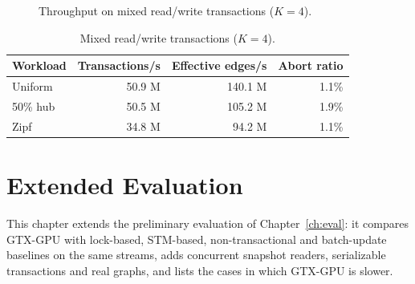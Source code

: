 \documentclass[11pt,a4paper,oneside]{report}
\newcommand{\sys}{GTX-GPU}
\begin{document}
\begin{figure}[H]
\centering
{}
\caption{Throughput on mixed read/write transactions ($K=4$).}
\label{fig:mix}
\end{figure}

\begin{table}[H]
\caption{Mixed read/write transactions ($K=4$).}
\label{tab:mix}
\small
\begin{singlespace}
\centering
\begin{tabular}{@{}lrrr@{}}
\toprule
Workload & Transactions/s & Effective edges/s & Abort ratio \\
\midrule
Uniform & 50.9 M & 140.1 M & 1.1\% \\
50\% hub & 50.5 M & 105.2 M & 1.9\% \\
Zipf & 34.8 M & 94.2 M & 1.1\% \\
\bottomrule
\end{tabular}
\end{singlespace}
\end{table}

\chapter{Extended Evaluation}
\label{ch:exteval}
This chapter extends the preliminary evaluation of Chapter~\ref{ch:eval}: it compares \sys{} with lock-based,
STM-based, non-transactional and batch-update baselines on the same streams, adds concurrent snapshot readers,
serializable transactions and real graphs, and lists the cases in which \sys{} is slower.
\end{document}
